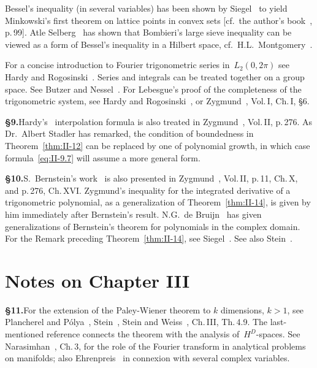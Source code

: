 \noindent Bessel's inequality (in several variables) has been shown by Siegel~\cite{siegel1935} to yield Minkowski's first theorem on lattice points in convex sets [cf.~the author's book~\cite{chandrasekharan1968}, p.\,99]. Atle Selberg~\cite{selbergtoappear} has shown that Bombieri's large sieve inequality can be viewed as a form of Bessel's inequality in a Hilbert space, cf.~H.L.~Montgomery~\cite{montgomery1978}.

\noindent For a concise introduction to Fourier trigonometric series in~$L_2(0,2\pi)$ see Hardy and Rogosinski~\cite{hardyrogo1944}. Series and integrals can be treated together on a group space. See Butzer and Nessel~\cite{butzernessel1971}. For Lebesgue's proof of the completeness of the trigonometric system, see Hardy and Rogosinski~\cite{hardyrogo1944}, or Zygmund~\cite{zygmund1959}, Vol.\,I, Ch.\,I, §6.

\noindent\textbf{§9.}\quad Hardy's~\cite{hardy1941} interpolation formula is also treated in Zygmund~\cite{zygmund1959}, Vol.\,II, p.\,276. As Dr.~Albert Stadler has remarked, the condition of boundedness in Theorem~\ref{thm:II-12} can be replaced by one of polynomial growth, in which case formula~\eqref{eq:II-9.7} will assume a more general form.

\noindent\textbf{§10.}\quad S.~Bernstein's work~\cite{bernstein1912} is also presented in Zygmund~\cite{zygmund1959}, Vol.\,II, p.\,11, Ch.\,X, and p.\,276, Ch.\,XVI. Zygmund's inequality for the integrated derivative of a trigonometric polynomial, as a generalization of Theorem~\ref{thm:II-14}, is given by him immediately after Bernstein's result. N.G.~de Bruijn~\cite{debruijn1947} has given generalizations of Bernstein's theorem for polynomials in the complex domain. For the Remark preceding Theorem~\ref{thm:II-14}, see Siegel~\cite{siegel1935}. See also Stein~\cite{stein1957}.

\section*{Notes on Chapter III}

\noindent\textbf{§11.}\quad For the extension of the Paley-Wiener theorem to $k$ dimensions, $k>1$, see Plancherel and P\'olya~\cite{plancherelpolya1937}, Stein~\cite{stein1957}, Stein and Weiss~\cite{steinweiss1971}, Ch.\,III, Th.\,4.9. The last-mentioned reference connects the theorem with the analysis of~$H^D$-spaces. See Narasimhan~\cite{narasimhan1968}, Ch.\,3, for the role of the Fourier transform in analytical problems on manifolds; also Ehrenpreis~\cite{ehrenpreis1970} in connexion with several complex variables.

